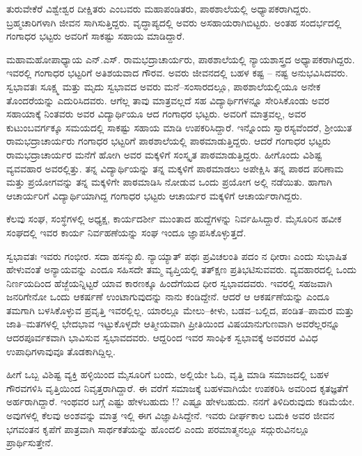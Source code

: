 ತುರುವೇಕೆರೆ ವಿಶ್ವೇಶ್ವರ ದೀಕ್ಷಿತರು ಎಂಬವರು ಮಹಾಪಂಡಿತರು, ಪಾಠಶಾಲೆಯಲ್ಲಿ ಅಧ್ಯಾಪಕರಾಗಿದ್ದರು. ಬ್ರಹ್ಮಚಾರಿಗಳಾಗಿ ಜೀವನ ಸಾಗಿಸುತ್ತಿದ್ದರು. ವೃದ್ಧಾಪ್ಯದಲ್ಲಿ ಅವರು ಅಸಹಾಯರಾಗಿಬಿಟ್ಟರು. ಅಂತಹ ಸಂದರ್ಭದಲ್ಲಿ ಗಂಗಾಧರ ಭಟ್ಟರು ಅವರಿಗೆ ಸಾಕಷ್ಟು ಸಹಾಯ ಮಾಡಿದ್ದಾರೆ. 

ಮಹಾಮಹೋಪಾಧ್ಯಾಯ ಎನ್.ಎಸ್. ರಾಮಭದ್ರಾಚಾರ್ಯರು, ಪಾಠಶಾಲೆಯಲ್ಲಿ ನ್ಯಾಯಶಾಸ್ತ್ರದ ಅಧ್ಯಾಪಕರಾಗಿದ್ದರು. ಇವರಲ್ಲಿ ಗಂಗಾಧರ ಭಟ್ಟರಿಗೆ ಅತಿಶಯವಾದ ಗೌರವ. ಅವರು ಜೀವನದಲ್ಲಿ ಬಹಳ ಕಷ್ಟ – ನಷ್ಟ ಅನುಭವಿಸಿದವರು. ಸ್ವಭಾವತಃ ಸೂಕ್ಷ್ಮ ಮತ್ತು ಮೃದು ಸ್ವಭಾವದ ಅವರು ಮನೆ–ಸಂಸಾರದಲ್ಲೂ, ಪಾಠಶಾಲೆಯಲ್ಲಿಯೂ ಅನೇಕ ತೊಂದರೆಯನ್ನು ಎದುರಿಸಿದವರು. ಆಗೆಲ್ಲ ತಾವು ಮಾತ್ರವಲ್ಲದೆ ಸಹ ವಿದ್ಯಾರ್ಥಿಗಳನ್ನೂ ಸೇರಿಸಿಕೊಂಡು ಅವರ ಸಹಾಯಾಕ್ಕೆ ನಿಂತವರು ಅವರ ವಿದ್ಯಾರ್ಥಿಯೂ ಆದ ಗಂಗಾಧರ ಭಟ್ಟರು. ಅವರಿಗೆ ಮಾತ್ರವಲ್ಲ, ಅವರ  ಕುಟುಂಬವರ್ಗಕ್ಕೂ ಸಮಯದಲ್ಲಿ ಸಾಕಷ್ಟು ಸಹಾಯ ಮಾಡಿ ಉಪಕರಿಸಿದ್ದಾರೆ. ಇನ್ನೊಂದು ಸ್ವಾರಸ್ಯವೆಂದರೆ, ಶ್ರೀಯುತ ರಾಮಭದ್ರಾಚಾರ್ಯರು ಗಂಗಾಧರ ಭಟ್ಟರಿಗೆ ಪಾಠಶಾಲೆಯಲ್ಲಿ ಪಾಠಮಾಡುತ್ತಿದ್ದರು. ಆದರೆ ಗಂಗಾಧರ ಭಟ್ಟರು ರಾಮಭದ್ರಾಚಾರ್ಯರ  ಮನೆಗೆ ಹೋಗಿ ಅವರ ಮಕ್ಕಳಿಗೆ ಸಂಸ್ಕೃತ ಪಾಠಮಾಡುತ್ತಿದ್ದರು. ಹೀಗೊಂದು ವಿಶಿಷ್ಟ ವ್ಯವವಹಾರ ಅವರಲ್ಲಿತ್ತು. ತನ್ನ ವಿದ್ಯಾರ್ಥಿಯನ್ನು ತನ್ನ ಮಕ್ಕಳಿಗೆ ಪಾಠಮಾಡಲು ಅಪೇಕ್ಷಿಸಿ ತನ್ನ ಪಾಠದ ಪರಿಣಾಮ ಮತ್ತು ಪ್ರಯೋಗವನ್ನು ತನ್ನ ಮಕ್ಕಳಿಗೇ ಪಾಠಮಾಡಿಸಿ ನೋಡುವ ಒಂದು ಪ್ರಯೋಗ ಅಲ್ಲಿ ನಡೆಯಿತು.  ಹಾಗಾಗಿ ಆಚಾರ್ಯರಿಗೆ ವಿದ್ಯಾರ್ಥಿಯಾಗಿದ್ದ ಗಂಗಾಧರ ಭಟ್ಟರು  ಆಚಾರ್ಯರ ಮಕ್ಕಳಿಗೆ ಆಚಾರ್ಯರಾಗಿದ್ದರು.

ಕೆಲವು ಸಂಘ, ಸಂಸ್ಥೆಗಳಲ್ಲಿ ಅಧ್ಯಕ್ಷ, ಕಾರ್ಯದರ್ಶೀ ಮುಂತಾದ ಹುದ್ದೆಗಳನ್ನು ನಿರ್ವಹಿಸಿದ್ದಾರೆ. ಮೈಸೂರಿನ ಹವೀಕ ಸಂಘದಲ್ಲಿ ಇವರ ಕಾರ್ಯ ನಿರ್ವಹಣೆಯನ್ನು ಸಂಘ ಇಂದೂ ಜ್ಞಾಪಸಿಕೊಳ್ಳುತ್ತದೆ. 

ಸ್ವಭಾವತಃ ಇವರು ಗಂಭೀರ. ಸದಾ ಹಸನ್ಮುಖಿ. ನ್ಯಾಯ್ಯಾತ್ ಪಥಃ ಪ್ರವಿಚಲಂತಿ ಪದಂ ನ ಧೀರಾಃ ಎಂದು ಸುಭಾಷಿತ ಹೇಳುವಂತೆ ಅನ್ಯಾಯವನ್ನು ಎಂದೂ ಸಹಿಸದೇ ತಮ್ಮ ವ್ಯಪ್ತಿಯಲ್ಲಿ ತತ್ಕ್ಷಣ ಪ್ರತಿಭಟಿಸುವವರು. ವ್ಯವಹಾರದಲ್ಲಿ ಒಂದು  ನಿರ್ಣಯದಿಂದ ಹೆಜ್ಜೆಯನ್ನಿಟ್ಟರೆ ಯಾವ ಕಾರಣಕ್ಕೂ ಹಿಂದೆಗೆಯದ ಧೀರ ಸ್ವಭಾವದವರು. ಇವರಲ್ಲಿ ಸಹಜವಾಗಿ ಜನರಿಗೇನೋ ಒಂದು ಆಕರ್ಷಣೆ ಉಂಟಾಗುವುದನ್ನು ನಾನು ಕಂಡಿದ್ದೇನೆ. ಆದರೆ ಆ ಆಕರ್ಷಣೆಯನ್ನು ಎಂದೂ ತಮಗಾಗಿ ಬಳಸಿಕೊಳ್ಳುವ ಪ್ರವೃತ್ತಿ ಇವರಲ್ಲಿಲ್ಲ.  ಯಾರಲ್ಲೂ ಮೇಲು–ಕೀಳು, ಬಡವ–ಬಲ್ಲಿದ, ಪಂಡಿತ–ಪಾಮರ ಮತ್ತು ಜಾತಿ–ಮತಗಳಲ್ಲಿ ಭೇದಭಾವ ಇಟ್ಟುಕೊಳ್ಳದೇ ಆತ್ಮೀಯವಾಗಿ ಪ್ರೀತಿಯಿಂದ ವಿಷಯಾನುಗುಣವಾಗಿ ಅವರೆಲ್ಲರನ್ನೂ ಆದರಪೂರ್ವಕವಾಗಿ ಭಾವಿಸುವ ಸ್ವಭಾವದವರು. ಆದ್ದರಿಂದ ಇವರ ಸಾಂಘಿಕ ಸ್ವಭಾವಕ್ಕೆ ಅವರವರ ವಿವಿಧ ಉಪಾಧಿಗಳಾವುವೂ  ತೊಡಕಾಗಿದ್ದಿಲ್ಲ.

ಹೀಗೆ ಒಬ್ಬ ವಿಶಿಷ್ಟ ವ್ಯಕ್ತಿ ಹಳ್ಳಿಯಿಂದ ಮೈಸೂರಿಗೆ ಬಂದು, ಅಲ್ಲಿಯೇ ಓದಿ, ವೃತ್ತಿ ಮಾಡಿ ಸಮಾಜದಲ್ಲಿ ಬಹಳ ಗೌರವಗಳಿಸಿ ವೃತ್ತಿಯಿಂದ ನಿವೃತ್ತರಾಗಿದ್ದಾರೆ. ಈ ವರೆಗೆ ಸಮಾಜಕ್ಕೆ ಬಹಳವಾಗಿಯೇ ಉಪಕರಿಸಿ ಅವರಿಂದ ಕೃತಜ್ಞತೆಗೆ ಅರ್ಹರಾಗಿದ್ದಾರೆ. ಇಂಥವರ ಬಗ್ಗೆ ಎಷ್ಟು ಹೇಳಬಹುದು !? ಎಷ್ಟೂ ಹೇಳಬಹುದು. ನನಗೆ ತಿಳಿದಿರುವುದು ಕಡಿಮೆಯೇ. ಅವುಗಳಲ್ಲಿ ಕೆಲವು ಅಂಶವನ್ನು ಮಾತ್ರ ಇಲ್ಲಿ ಈಗ ವಿಜ್ಞಾಪಿಸಿದ್ದೇನೆ. ಇವರು ದೀರ್ಘಕಾಲ ಬದುಕಿ ಅವರ ಜೀವನ ಭಗವಂತನ ಕೃಪೆಗೆ ಪಾತ್ರವಾಗಿ ಸಾರ್ಥಕತೆಯನ್ನು ಹೊಂದಲಿ ಎಂದು ಪರಮಾತ್ಮನಲ್ಲೂ ಸದ್ಗುರುವಿನಲ್ಲೂ ಪ್ರಾರ್ಥಿಸುತ್ತೇನೆ.

\articleend
